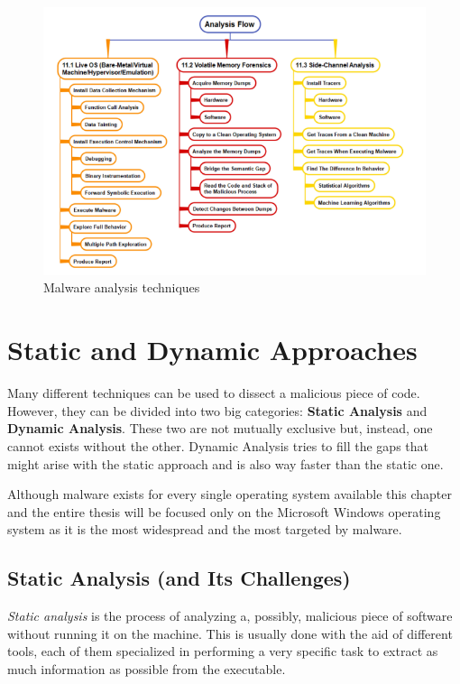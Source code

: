 \begin{figure}[t!]
\centering
\includegraphics[width=\linewidth]{images/dynanalysis.png}
\caption{Malware analysis techniques}
\label{fig:mat}
\end{figure}


\section{Static and Dynamic Approaches}

Many different techniques can be used to dissect a malicious piece of code. However, they can be divided into two big categories: \textbf{Static Analysis} and \textbf{Dynamic Analysis}. These two are not mutually exclusive but, instead, one cannot exists without the other. Dynamic Analysis tries to fill the gaps that might arise with the static approach and is also way faster than the static one.

Although malware exists for every single operating system available this chapter and the entire thesis will be focused only on the Microsoft Windows operating system as it is the most widespread and the most targeted by malware. 


\subsection*{Static Analysis (and Its Challenges)}

\textit{Static analysis} is the process of analyzing a, possibly, malicious piece of software without running it on the machine. This is usually done with the aid of different tools, each of them specialized in performing a very specific task to extract as much information as possible from the executable. 


